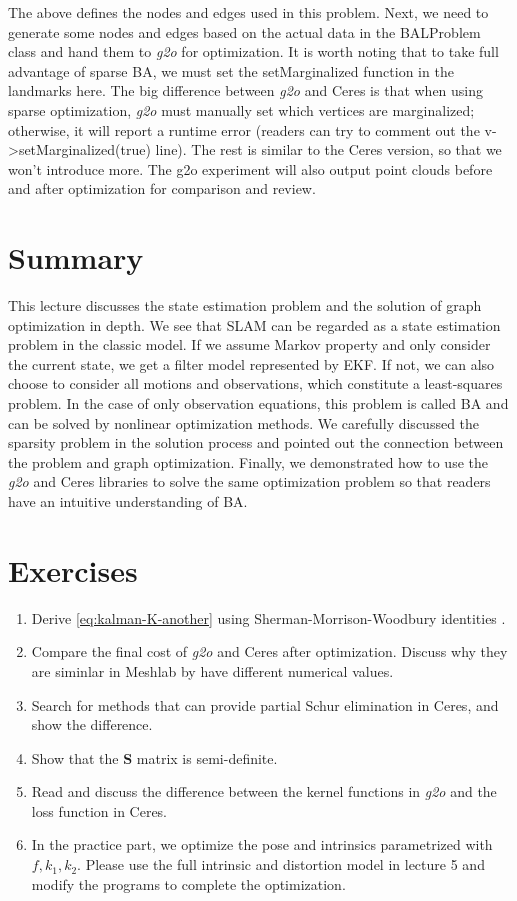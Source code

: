 The above defines the nodes and edges used in this problem. Next, we need to generate some nodes and edges based on the actual data in the BALProblem class and hand them to \textit{g2o} for optimization. It is worth noting that to take full advantage of sparse BA, we must set the setMarginalized function in the landmarks here. The big difference between \textit{g2o} and Ceres is that when using sparse optimization, \textit{g2o} must manually set which vertices are marginalized; otherwise, it will report a runtime error (readers can try to comment out the v->setMarginalized(true) line). The rest is similar to the Ceres version, so that we won't introduce more. The g2o experiment will also output point clouds before and after optimization for comparison and review.

\section{Summary}
This lecture discusses the state estimation problem and the solution of graph optimization in depth. We see that SLAM can be regarded as a state estimation problem in the classic model. If we assume Markov property and only consider the current state, we get a filter model represented by EKF. If not, we can also choose to consider all motions and observations, which constitute a least-squares problem. In the case of only observation equations, this problem is called BA and can be solved by nonlinear optimization methods. We carefully discussed the sparsity problem in the solution process and pointed out the connection between the problem and graph optimization. Finally, we demonstrated how to use the \textit{g2o} and Ceres libraries to solve the same optimization problem so that readers have an intuitive understanding of BA.

\section*{Exercises}
\begin{enumerate}
	\item Derive \eqref{eq:kalman-K-another} using Sherman-Morrison-Woodbury identities \cite{Sherman1950, Barfoot2016}.
	\item 
	Compare the final cost of \textit{g2o} and Ceres after optimization. Discuss why they are siminlar in Meshlab by have different numerical values.
	\item 
	Search for methods that can provide partial Schur elimination in Ceres, and show the difference. 
	\item Show that the $\mathbf{S}$ matrix is semi-definite. 
	\item Read \cite{Kummerle2011} and discuss the difference between the kernel functions in \textit{g2o} and the loss function in Ceres.
	\item[\optional] In the practice part, we optimize the pose and intrinsics parametrized with $f, k_1, k_2$. Please use the full intrinsic and distortion model in lecture 5 and modify the programs to complete the optimization. 
\end{enumerate}

